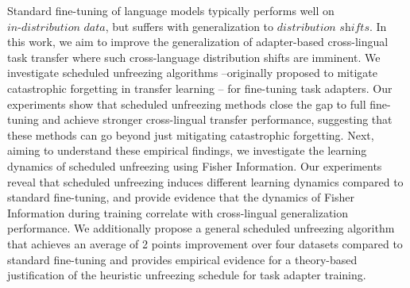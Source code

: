 Standard fine-tuning of language models typically performs well on $\textit{in-distribution data}$, but suffers with generalization to $\textit{distribution shifts}$. In this work, we aim to improve the generalization of adapter-based cross-lingual task transfer where such cross-language distribution shifts are imminent. We investigate scheduled unfreezing algorithms --originally proposed to mitigate catastrophic forgetting in transfer learning -- for fine-tuning task adapters. Our experiments show that scheduled unfreezing methods close the gap to full fine-tuning and achieve stronger cross-lingual transfer performance, suggesting that these methods can go beyond just mitigating catastrophic forgetting. Next, aiming to understand these empirical findings, we investigate the learning dynamics of scheduled unfreezing using Fisher Information. Our experiments reveal that scheduled unfreezing induces different learning dynamics compared to standard fine-tuning, and provide evidence that the dynamics of Fisher Information during training correlate with cross-lingual generalization performance. We additionally propose a general scheduled unfreezing algorithm that achieves an average of 2 points improvement over four datasets compared to standard fine-tuning and provides empirical evidence for a theory-based justification of the heuristic unfreezing schedule for task adapter training.